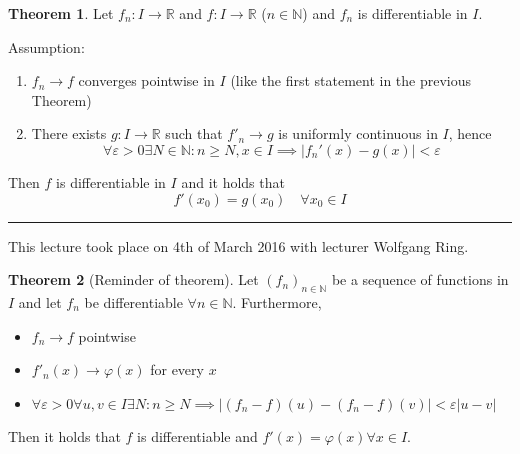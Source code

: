 \documentclass[a4paper,landscape,twocolumn]{article}
\theoremstyle{definition}
\newtheorem{theorem}{Theorem}
\newcommand\abs[1]{\left|#1\right|}
\newcommand\meta[3]{\hrule{} This #1 took place on #2 with lecturer #3.\par}
\begin{document}
\begin{theorem}
  Let $f_n: I \to \mathbb R$ and $f: I \to \mathbb R$ ($n \in \mathbb N$)
  and $f_n$ is differentiable in $I$.

  Assumption:
  \begin{enumerate}
    \item $f_n \to f$ converges pointwise in $I$
      (like the first statement in the previous Theorem)
    \item There exists $g: I \to \mathbb R$ such that
      $f'_n \to g$ is uniformly continuous in $I$, hence
      \[
        \forall \varepsilon > 0 \exists N \in \mathbb N: n \geq N, x \in I
        \implies \abs{f_n'(x) - g(x)} < \varepsilon
      \]
  \end{enumerate}
  Then $f$ is differentiable in $I$ and it holds that
  \[ f'(x_0) = g(x_0) \quad \forall x_0 \in I \]
\end{theorem}

\meta{lecture}{4th of March 2016}{Wolfgang Ring}

\begin{theorem}[Reminder of theorem]
  \label{thm:diff-conv}
  Let $(f_n)_{n\in\mathbb N}$ be a sequence of functions in $I$ and
  let $f_n$ be differentiable $\forall n \in \mathbb N$. Furthermore,
  \begin{itemize}
    \item $f_n \to f$ pointwise
    \item $f'_n(x) \to \varphi(x)$ for every $x$
    \item $\forall \varepsilon > 0 \forall u,v \in I \exists N: n \geq N
      \implies \abs{(f_n - f)(u) - (f_n - f)(v)} < \varepsilon \abs{u - v}$
  \end{itemize}
  Then it holds that $f$ is differentiable and $f'(x) = \varphi(x) \forall x \in I$.
\end{theorem}
\end{document}
